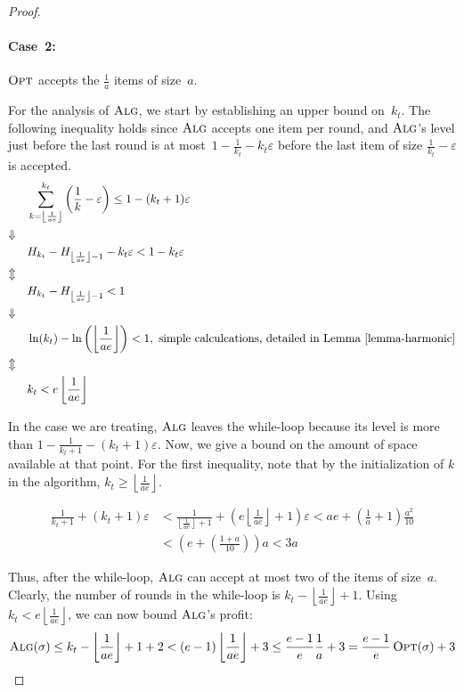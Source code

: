 \documentclass[a4paper,UKenglish,cleveref, autoref, thm-restate]{lipics-v2021}
\newcommand{\ALG}{\ensuremath{\operatorname{\textsc{Alg}}}\xspace}
\newcommand{\OPT}{\ensuremath{\operatorname{\textsc{Opt}}}\xspace}
\newcommand{\FLOOR}[1]{\left\lfloor#1\right\rfloor}
\newcommand{\eps}{\ensuremath{\varepsilon}}
\newcommand{\kfinal}{\ensuremath{k_t}\xspace}
\begin{document}
\begin{proof}
\paragraph*{Case~2:}
\OPT accepts the $\frac{1}{a}$ items of size~$a$.

For the analysis of \ALG, we start by establishing an upper bound
on~$\kfinal$.  The following inequality holds since \ALG accepts one item
per round, and \ALG's level just before the last round is at
most~$1-\frac{1}{\kfinal}-\kfinal\eps$ before the last item of size
$\frac{1}{\kfinal}-\eps$ is accepted.
\begin{align*}
  & \sum_{k=\FLOOR{\frac{1}{ae}}}^{\kfinal}\left(\frac{1}{k}-\eps\right) \leq 1-(\kfinal+1)\eps \\
\Downarrow~~~ \\
  & H_{\kfinal} - H_{\FLOOR{\frac{1}{ae}}-1} -\kfinal\eps < 1 - \kfinal\eps \\
\Updownarrow~~~ \\
  & H_{\kfinal} - H_{\FLOOR{\frac{1}{ae}}-1} < 1 \\
\Downarrow~~~ \\
  & \ln(\kfinal) - \ln\left(\FLOOR{\frac{1}{ae}}\right) < 1, \mbox{ simple calculcations, detailed in Lemma~\ref{lemma-harmonic}} \\
\Updownarrow~~~ \\
  & \kfinal < e\FLOOR{\frac{1}{ae}}
\end{align*}

In the case we are treating, \ALG leaves the while-loop because its
level is more than $1-\frac{1}{\kfinal+1}-(\kfinal+1)\eps$.  Now, we give a bound
on the amount of space available at that point.  For the first
inequality, note that by the initialization of $k$ in the algorithm,
$\kfinal \geq \FLOOR{\frac{1}{ae}}$.

\begin{align*}
\frac{1}{\kfinal+1}+(\kfinal+1)\eps
& <  \frac{1}{\FLOOR{\frac{1}{ae}}+1} + \left(e\FLOOR{\frac{1}{ae}}+1\right)\eps 
 <  ae + \left(\frac{1}{a} + 1\right)\frac{a^2}{10} \\
& <  \left(e + \left(\frac{1+a}{10}\right)\right)a 
 <  3a
\end{align*}

Thus, after the while-loop, \ALG can accept at most two of the items
of size~$a$.  Clearly, the number of rounds in the while-loop is
$\kfinal-\FLOOR{\frac{1}{ae}}+1$.  Using $\kfinal < e\FLOOR{\frac{1}{ae}}$,
we can now bound \ALG's profit:
\[\ALG(\sigma)\leq \kfinal-\FLOOR{\frac{1}{ae}}+1+2<(e-1)\FLOOR{\frac{1}{ae}}+3\leq \frac{e-1}{e}\frac{1}{a}+3
=\frac{e-1}{e}\OPT(\sigma)+3\]


\end{proof}
\end{document}
